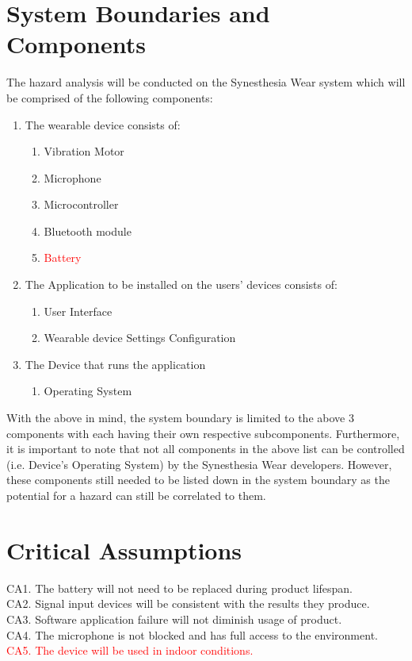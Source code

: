 \documentclass[12pt, titlepage]{article}
\begin{document}
\section{System Boundaries and Components}
The hazard analysis will be conducted on the Synesthesia Wear system which will be 
comprised of the following components:
\begin{enumerate}
    \item The wearable device consists of:
    \begin{enumerate}
        \item Vibration Motor
        \item Microphone
        \item Microcontroller
        \item Bluetooth module
        \item \textcolor{red}{Battery}
    \end{enumerate}
    \item The Application to be installed on the users' devices consists of:
    \begin{enumerate}
        \item User Interface
        \item Wearable device Settings Configuration
    \end{enumerate}
    \item The Device that runs the application
    \begin{enumerate}
        \item Operating System
    \end{enumerate}
\end{enumerate}

\noindent With the above in mind, the system boundary is limited to the above 3 components with 
each having their own respective subcomponents. Furthermore, it is important to note 
that not all components in the above list can be controlled (i.e. Device's Operating 
System) by the Synesthesia Wear developers. However, these components still needed to 
be listed down in the system boundary as the potential for a hazard can still be 
correlated to them.

\section{Critical Assumptions}

CA1. The battery will not need to be replaced during product lifespan.
\\CA2. Signal input devices will be consistent with the results they produce.
\\CA3. Software application failure will not diminish usage of product.
\\CA4. The microphone is not blocked and has full access to the environment. 
\\ \textcolor{red}{CA5. The device will be used in indoor conditions.}
\end{document}
